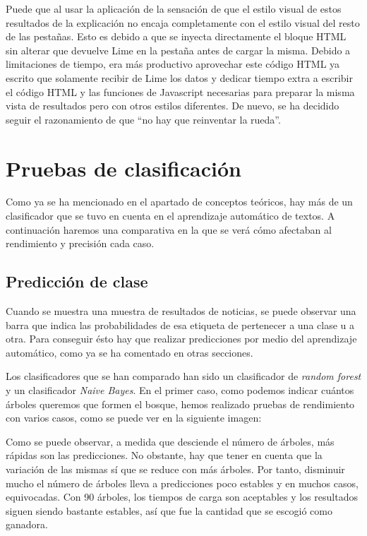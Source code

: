 Puede que al usar la aplicación de la sensación de que el estilo visual de estos resultados de la explicación no encaja completamente con el estilo visual del resto de las pestañas. Esto es debido a que se inyecta directamente el bloque HTML sin alterar que devuelve Lime en la pestaña antes de cargar la misma. Debido a limitaciones de tiempo, era más productivo aprovechar este código HTML ya escrito que solamente recibir de Lime los datos y dedicar tiempo extra a escribir el código HTML y las funciones de Javascript necesarias para preparar la misma vista de resultados pero con otros estilos diferentes. De nuevo, se ha decidido seguir el razonamiento de que ``no hay que reinventar la rueda''.

\section{Pruebas de clasificación}

Como ya se ha mencionado en el apartado de conceptos teóricos, hay más de un clasificador que se tuvo en cuenta en el aprendizaje automático de textos. A continuación haremos una comparativa en la que se verá cómo afectaban al rendimiento y precisión cada caso.

\subsection{Predicción de clase}

Cuando se muestra una muestra de resultados de noticias, se puede observar una barra que indica las probabilidades de esa etiqueta de pertenecer a una clase u a otra. Para conseguir ésto hay que realizar predicciones por medio del aprendizaje automático, como ya se ha comentado en otras secciones.

Los clasificadores que se han comparado han sido un clasificador de \emph{random forest} y un clasificador \emph{Naive Bayes}. En el primer caso, como podemos indicar cuántos árboles queremos que formen el bosque, hemos realizado pruebas de rendimiento con varios casos, como se puede ver en la siguiente imagen:


Como se puede observar, a medida que desciende el número de árboles, más rápidas son las predicciones. No obstante, hay que tener en cuenta que la variación de las mismas sí que se reduce con más árboles. Por tanto, disminuir mucho el número de árboles lleva a predicciones poco estables y en muchos casos, equivocadas. Con 90 árboles, los tiempos de carga son aceptables y los resultados siguen siendo bastante estables, así que fue la cantidad que se escogió como ganadora.


